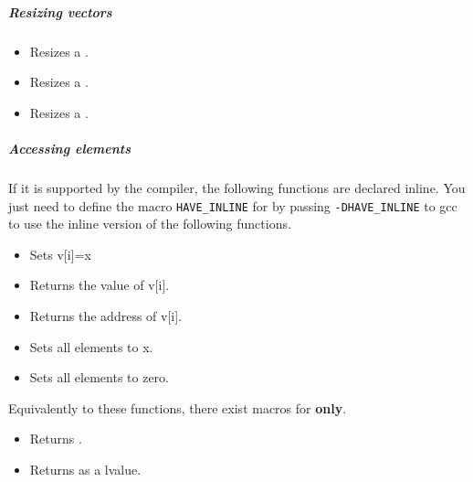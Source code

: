 \subparagraph{Resizing vectors}
\begin{itemize}
\item {}
  \sshortdescribe Resizes a .  
\item {} 
  \sshortdescribe Resizes a .  
\item {} 
  \sshortdescribe Resizes a .  
\end{itemize}  

\subparagraph{Accessing elements}

If it is supported by the compiler, the following functions are declared inline. You
just need to define the macro \verb!HAVE_INLINE! for by passing
\verb!-DHAVE_INLINE! to gcc to use the inline version of the following
functions.
\begin{itemize}
\item {}
  \sshortdescribe Sets v[i]=x  
\item {}
  \sshortdescribe Returns the value of v[i].  
\item {}
  \sshortdescribe Returns the address of v[i].  
\item {}
  \sshortdescribe Sets all elements to x.  
\item {}
  \sshortdescribe Sets all elements to zero.  
\end{itemize}
Equivalently to these functions, there exist macros for {\bf {} only}.
\begin{itemize}
\item {}
  \sshortdescribe Returns .
  
\item {}
  \sshortdescribe Returns  as a lvalue.
\end{itemize}


